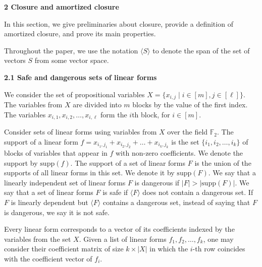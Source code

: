 \par\medskip\noindent\textbf{
2 Closure and amortized closure}\par


In this section, we give preliminaries about closure, provide a definition of amortized closure, and prove its main properties.\par



Throughout the paper, we use the notation $\langle S\rangle$ to denote the span of the set of vectors $S$ from some vector space.\par


\par\medskip\noindent\textbf{
2.1 Safe and dangerous sets of linear forms}\par


We consider the set of propositional variables $X=\{x_{i,j}\mid i\in[m],j\in[\ell]\}$. The variables from $X$ are divided into $m$ blocks by the value of the first index. The variables $x_{i,1},x_{i,2},\dots,x_{i,\ell}$ form the $i$th block, for $i\in[m]$.\par



Consider sets of linear forms using variables from $X$ over the field $\mathbb{F}_{2}$.
The support of a linear form $f=x_{i_{1},j_{1}}+x_{i_{2},j_{2}}+\dots+x_{i_{k},j_{k}}$ is the set $\{i_{1},i_{2},\dots,i_{k}\}$ of blocks of variables that appear in $f$ with non-zero coefficients. We denote the support by $\mathrm{supp}(f)$.
The support of a set of linear forms $F$ is the union of the supports of all linear forms in this set. We denote it by $\mathrm{supp}(F)$.
We say that a linearly independent set of linear forms $F$ is dangerous if $|F|>|\mathrm{supp}(F)|$.
We say that a set of linear forms $F$ is safe if $\langle F\rangle$ does not contain a dangerous set.
If $F$ is linearly dependent but $\langle F\rangle$ contains a dangerous set, instead of saying that $F$ is dangerous, we say it is not safe.\par



Every linear form corresponds to a vector of its coefficients indexed by the variables from the set $X$. Given a list of linear forms $f_{1},f_{2},\dots,f_{k}$, one may consider their coefficient matrix of size $k\times|X|$ in which the $i$-th row coincides with the coefficient vector of $f_{i}$.\par



